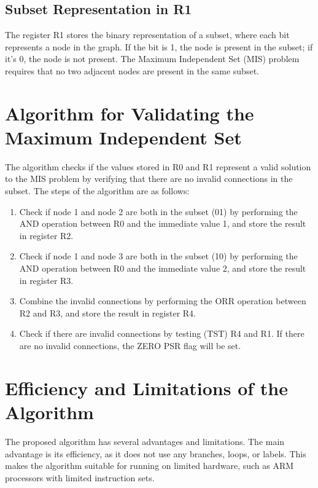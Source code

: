 \subsection{Subset Representation in R1}

The register R1 stores the binary representation of a subset, where each bit represents a node in the graph. If the bit is 1, the node is present in the subset; if it's 0, the node is not present. The Maximum Independent Set (MIS) problem requires that no two adjacent nodes are present in the same subset.

\section{Algorithm for Validating the Maximum Independent Set}

The algorithm checks if the values stored in R0 and R1 represent a valid solution to the MIS problem by verifying that there are no invalid connections in the subset. The steps of the algorithm are as follows:

\begin{enumerate}
  \item Check if node 1 and node 2 are both in the subset (01) by performing the AND operation between R0 and the immediate value 1, and store the result in register R2.
  \item Check if node 1 and node 3 are both in the subset (10) by performing the AND operation between R0 and the immediate value 2, and store the result in register R3.
  \item Combine the invalid connections by performing the ORR operation between R2 and R3, and store the result in register R4.
  \item Check if there are invalid connections by testing (TST) R4 and R1. If there are no invalid connections, the ZERO PSR flag will be set.
\end{enumerate}

\section{Efficiency and Limitations of the Algorithm}

The proposed algorithm has several advantages and limitations. The main advantage is its efficiency, as it does not use any branches, loops, or labels. This makes the algorithm suitable for running on limited hardware, such as ARM processors with limited instruction sets.

